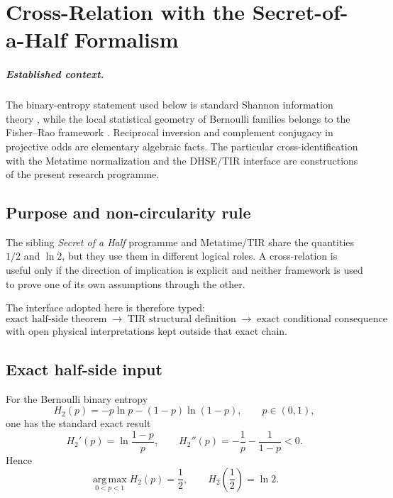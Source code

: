 \chapter{Cross-Relation with the Secret-of-a-Half Formalism}
\label{app:secret-half-cross-relation}


\paragraph{Established context.}
The binary-entropy statement used below is standard Shannon information theory
\cite{shannon1948}, while the local statistical geometry of Bernoulli families
belongs to the Fisher--Rao framework \cite{Fisher1925,Rao1945}.  Reciprocal
inversion and complement conjugacy in projective odds are elementary algebraic
facts.  The particular cross-identification with the Metatime normalization and
the DHSE/TIR interface are constructions of the present research programme.

\section{Purpose and non-circularity rule}

The sibling \emph{Secret of a Half} programme and Metatime/TIR share the
quantities $1/2$ and $\ln2$, but they use them in different logical roles.  A
cross-relation is useful only if the direction of implication is explicit and
neither framework is used to prove one of its own assumptions through the
other.

The interface adopted here is therefore typed:
\[
\boxed{
\text{exact half-side theorem}
\;\longrightarrow\;
\text{TIR structural definition}
\;\longrightarrow\;
\text{exact conditional consequence}
}
\]
with open physical interpretations kept outside that exact chain.

\section{Exact half-side input}

For the Bernoulli binary entropy
\[
H_2(p)=-p\ln p-(1-p)\ln(1-p),
\qquad p\in(0,1),
\]
one has the standard exact result
\[
H_2'(p)=\ln\frac{1-p}{p},
\qquad
H_2''(p)=-\frac1p-\frac1{1-p}<0.
\]
Hence
\begin{equation}
\boxed{
\operatorname*{arg\,max}_{0<p<1} H_2(p)=\frac12,
\qquad
H_2\!\left(\frac12\right)=\ln2
}.
\label{eq:half-entropy-interface}
\end{equation}

